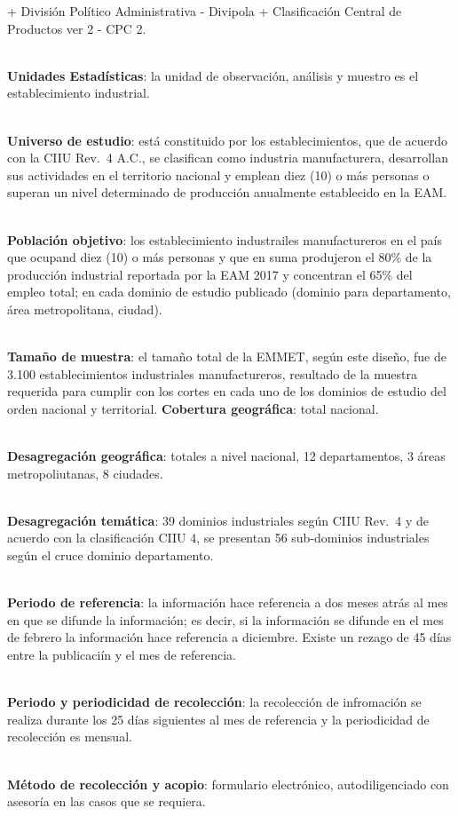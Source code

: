 \documentclass[
]{article}
\begin{document}
+ División Político Administrativa - Divipola + Clasificación Central de
Productos ver 2 - CPC 2.\\
\strut \\
\textbf{Unidades Estadísticas}: la unidad de observación, análisis y
muestro es el establecimiento industrial.\\
\strut \\
\textbf{Universo de estudio}: está constituido por los establecimientos,
que de acuerdo con la CIIU Rev.~4 A.C., se clasifican como industria
manufacturera, desarrollan sus actividades en el territorio nacional y
emplean diez (10) o más personas o superan un nivel determinado de
producción anualmente establecido en la EAM.\\
\strut \\
\textbf{Población objetivo}: los establecimiento industrailes
manufactureros en el país que ocupand diez (10) o más personas y que en
suma produjeron el 80\% de la producción industrial reportada por la EAM
2017 y concentran el 65\% del empleo total; en cada dominio de estudio
publicado (dominio para departamento, área metropolitana, ciudad).\\
\strut \\
\textbf{Tamaño de muestra}: el tamaño total de la EMMET, según este
diseño, fue de 3.100 establecimientos industriales manufactureros,
resultado de la muestra requerida para cumplir con los cortes en cada
uno de los dominios de estudio del orden nacional y territorial.
\textbf{Cobertura geográfica}: total nacional.\\
\strut \\
\textbf{Desagregación geográfica}: totales a nivel nacional, 12
departamentos, 3 áreas metropoliutanas, 8 ciudades.\\
\strut \\
\textbf{Desagregación temática}: 39 dominios industriales según CIIU
Rev.~4 y de acuerdo con la clasificación CIIU 4, se presentan 56
sub-dominios industriales según el cruce dominio departamento.\\
\strut \\
\textbf{Periodo de referencia}: la información hace referencia a dos
meses atrás al mes en que se difunde la información; es decir, si la
información se difunde en el mes de febrero la información hace
referencia a diciembre. Existe un rezago de 45 días entre la publicaciín
y el mes de referencia.\\
\strut \\
\textbf{Periodo y periodicidad de recolección}: la recolección de
infromación se realiza durante los 25 días siguientes al mes de
referencia y la periodicidad de recolección es mensual.\\
\strut \\
\textbf{Método de recolección y acopio}: formulario electrónico,
autodiligenciado con asesoría en las casos que se requiera.
\end{document}
